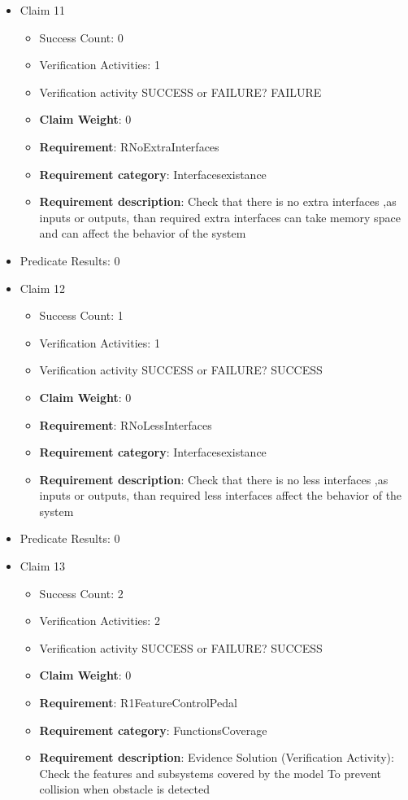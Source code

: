 \documentclass{article}
\begin{document}
\begin{itemize}
  				  \item Claim 11
				\begin{itemize}
			    	\item Success Count: 0 
			    	\item Verification Activities: 1
					\item Verification activity SUCCESS or FAILURE? FAILURE
					\item \textbf{Claim Weight}: 0
						\item \textbf{Requirement}: RNoExtraInterfaces 
						\item \textbf{Requirement category}: Interfacesexistance 
						\item \textbf{Requirement description}: Check that there is no extra interfaces ,as inputs or outputs, than required  extra interfaces can take memory space and can affect the behavior of the system
					
				\end{itemize}
				
									    
				\item Predicate Results: 0

  				  \item Claim 12
				\begin{itemize}
			    	\item Success Count: 1 
			    	\item Verification Activities: 1
					\item Verification activity SUCCESS or FAILURE? SUCCESS
					\item \textbf{Claim Weight}: 0
						\item \textbf{Requirement}: RNoLessInterfaces 
						\item \textbf{Requirement category}: Interfacesexistance 
						\item \textbf{Requirement description}: Check that there is no less interfaces ,as inputs or outputs, than required  less interfaces affect the behavior of the system
					
				\end{itemize}
				
									    
				\item Predicate Results: 0

  				  \item Claim 13
				\begin{itemize}
			    	\item Success Count: 2 
			    	\item Verification Activities: 2
					\item Verification activity SUCCESS or FAILURE? SUCCESS
					\item \textbf{Claim Weight}: 0
						\item \textbf{Requirement}: R1FeatureControlPedal 
						\item \textbf{Requirement category}: FunctionsCoverage 
						\item \textbf{Requirement description}: Evidence Solution (Verification Activity): Check the features and subsystems covered by the model  To prevent collision when obstacle is detected
					

\end{itemize}
\end{itemize}
\end{document}
